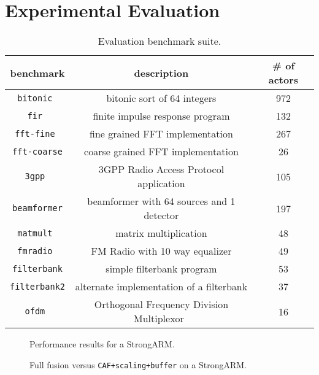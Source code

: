 \section{Experimental Evaluation}
\label{sec:evaluation}

\begin{table}[t]
\center
\label{tab:benchmarks}
\vspace{-12pt}
{\tiny
\begin{tabular}{|c|c|c|} \hline
{\bf benchmark}&{\bf description}&{\bf \# of actors}\\ \hline \hline
\texttt{bitonic	} &bitonic sort of 64 integers	&	972 \\ \hline
\texttt{fir	      } &finite impulse response program	&	132 \\ \hline
\texttt{fft-fine	} &fine grained FFT implementation	&	267 \\ \hline
\texttt{fft-coarse} &coarse grained FFT implementation	&	26 \\ \hline
\texttt{3gpp	} &3GPP Radio Access Protocol application	&	105 \\ \hline
\texttt{beamformer} &beamformer with 64 sources and 1 detector& 197 \\ \hline
\texttt{matmult	} &matrix multiplication	&	48 \\ \hline
\texttt{fmradio	} &FM Radio with 10 way equalizer	&	49 \\ \hline
\texttt{filterbank} &simple filterbank program	&	53 \\ \hline
\texttt{filterbank2}&alternate implementation of a filterbank &	37 \\ \hline
\texttt{ofdm	 }& Orthogonal Frequency Division Multiplexor~\cite{spectrumware}	&	16 \\ \hline
\end{tabular}
}
\vspace{-12pt}
\caption{Evaluation benchmark suite.}
\end{table}



\begin{figure*}
\begin{minipage}{3.4in}
\vspace{-36pt}
\hspace{-0.4in}
\vspace{-66pt}
\caption{Performance results for a StrongARM.\protect\label{fig:arm-perf2}}
\end{minipage}
\hspace{0.1in}
\begin{minipage}{3.4in}
\vspace{-36pt}
\hspace{-0.4in}
\vspace{-66pt}
\caption{Full fusion versus \texttt{CAF+scaling+buffer} on a StrongARM.\protect\label{fig:arm-perf}}
\end{minipage}
\end{figure*}

